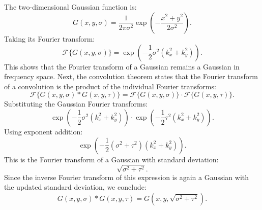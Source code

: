 \documentclass[12pt]{article}
\begin{document}
\subsection{}
The two-dimensional Gaussian function is:
\begin{equation}
    G(x,y,\sigma) = \frac{1}{2\pi\sigma^2} \exp\left(-\frac{x^2 + y^2}{2\sigma^2} \right).
\end{equation}
Taking its Fourier transform:
\begin{equation}
    \mathcal{F} \{ G(x,y,\sigma) \} = \exp\left(-\frac{1}{2} \sigma^2 (k_x^2 + k_y^2) \right).
\end{equation}
This shows that the Fourier transform of a Gaussian remains a Gaussian in frequency space.
Next, the convolution theorem states that the Fourier transform of a convolution is the product of the individual Fourier transforms:
\begin{equation}
    \mathcal{F} \{ G(x,y,\sigma) * G(x,y,\tau) \} = \mathcal{F} \{ G(x,y,\sigma) \} \cdot \mathcal{F} \{ G(x,y,\tau) \}.
\end{equation}
Substituting the Gaussian Fourier transforms:
\begin{equation}
    \exp\left(-\frac{1}{2} \sigma^2 (k_x^2 + k_y^2) \right) \cdot \exp\left(-\frac{1}{2} \tau^2 (k_x^2 + k_y^2) \right).
\end{equation}
Using exponent addition:
\begin{equation}
    \exp\left(-\frac{1}{2} (\sigma^2 + \tau^2) (k_x^2 + k_y^2) \right).
\end{equation}
This is the Fourier transform of a Gaussian with standard deviation:
\begin{equation}
    \sqrt{\sigma^2 + \tau^2}.
\end{equation}
Since the inverse Fourier transform of this expression is again a Gaussian with the updated standard deviation, we conclude:
\begin{equation}
    G(x,y,\sigma) * G(x,y,\tau) = G(x,y,\sqrt{\sigma^2 + \tau^2}).
\end{equation}

\subsection{}
\end{document}
